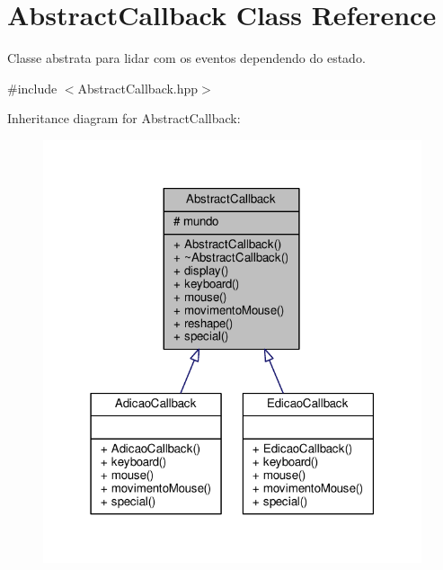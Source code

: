 \hypertarget{classAbstractCallback}{\section{Abstract\+Callback Class Reference}
\label{classAbstractCallback}
}


Classe abstrata para lidar com os eventos dependendo do estado.  




{\ttfamily \#include $<$Abstract\+Callback.\+hpp$>$}



Inheritance diagram for Abstract\+Callback\+:
\nopagebreak
\begin{figure}[H]
\begin{center}
\leavevmode
\includegraphics[width=316pt]{classAbstractCallback__inherit__graph}
\end{center}
\end{figure}


